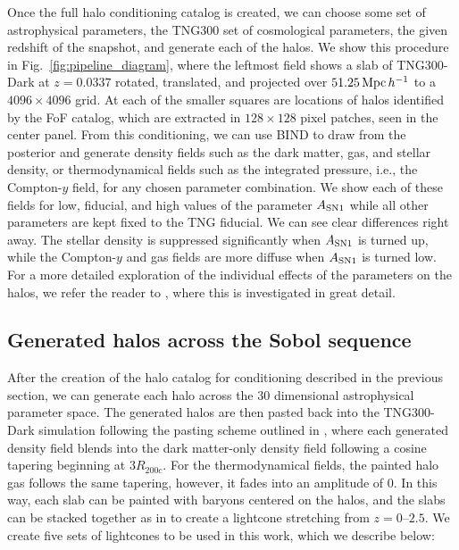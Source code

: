 \documentclass[linenumbers,trackchanges, twocolumn]{aastex701}
\begin{document}
Once the full halo conditioning catalog is created, we can choose some set of astrophysical parameters, the TNG300 set of cosmological parameters, the given redshift of the snapshot, and generate each of the halos. We show this procedure in Fig.~\ref{fig:pipeline_diagram}, where the leftmost field shows a slab of TNG300-Dark at $z=0.0337$ rotated, translated, and projected over $51.25\,{\rm Mpc}\,h^{-1}$ to a $4096\times 4096$ grid. At each of the smaller squares are locations of halos identified by the FoF catalog, which are extracted in $128\times128$ pixel patches, seen in the center panel. From this conditioning, we can use BIND to draw from the posterior and generate density fields such as the dark matter, gas, and stellar density, or thermodynamical fields such as the integrated pressure, i.e., the Compton-$y$ field, for any chosen parameter combination. We show each of these fields for low, fiducial, and high values of the parameter $A_{\rm SN1}$ while all other parameters are kept fixed to the TNG fiducial. We can see clear differences right away. The stellar density is suppressed significantly when $A_{\rm SN1}$ is turned up, while the Compton-$y$ and gas fields are more diffuse when $A_{\rm SN1}$ is turned low. For a more detailed exploration of the individual effects of the parameters on the halos, we refer the reader to \citet{Lee-2026b}, where this is investigated in great detail.

 
\subsection{Generated halos across the Sobol sequence}\label{sec:sobol}
After the creation of the halo catalog for conditioning described in the previous section, we can generate each halo across the 30 dimensional astrophysical parameter space. The generated halos are then pasted back into the TNG300-Dark simulation following the pasting scheme outlined in \citet{Lee-2026b}, where each generated density field blends into the dark matter-only density field following a cosine tapering beginning at $3R_{200c}$. For the thermodynamical fields, the painted halo gas follows the same tapering, however, it fades into an amplitude of 0. In this way, each slab can be painted with baryons centered on the halos, and the slabs can be stacked together as in \citet{Osato-2021} to create a lightcone stretching from $z=0$--$2.5$. We create five sets of lightcones to be used in this work, which we describe below:
 
\end{document}
